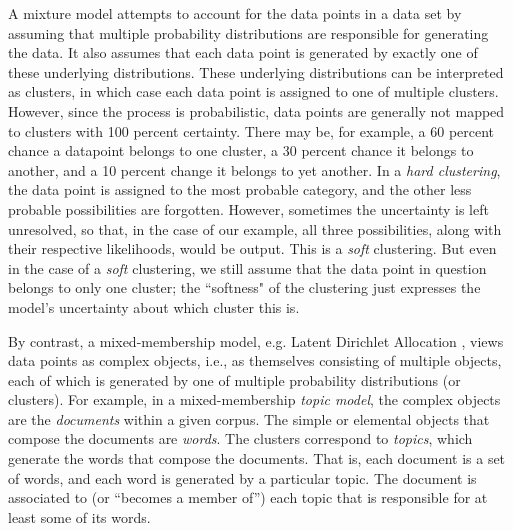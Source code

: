 A mixture model attempts to account for the data points in a data set by assuming that multiple probability
distributions are responsible for generating the data. It also assumes that each data point is generated
by exactly one of these underlying distributions. These underlying distributions can be interpreted as clusters, in which case each data point is assigned to one of multiple clusters. However, since the process is probabilistic,
data points are generally not mapped to clusters with 100 percent certainty. There may be, for example, a 60 percent chance a datapoint belongs to one cluster, a 30 percent chance it belongs to another, and a 10 percent change it belongs to yet another. In a \emph{hard clustering}, the data point is assigned to the most probable category, and the other less probable possibilities are forgotten. However, sometimes the uncertainty is left unresolved, so that, in the case of our example, all three possibilities, along with their respective likelihoods, would be output. This is a \emph{soft} clustering. But even in the case of a \emph{soft} clustering, we still assume that the data point in question belongs to only one cluster; the ``softness" of the clustering just expresses the model's uncertainty about which cluster this is. %

By contrast, a mixed-membership model, e.g. Latent Dirichlet Allocation \citep{blei-et-al:2003},
views data points as complex objects, i.e., as themselves consisting of multiple objects, 
each of which is generated by one of multiple probability distributions (or clusters). 
For example, in a mixed-membership \textit{topic model}, the complex objects are the 
\emph{documents} within a given corpus. The simple or elemental objects that compose 
the documents are \emph{words}. The clusters correspond to \emph{topics}, which generate 
the words that compose the documents. That is, each document is a set of words, and each 
word is generated by a particular topic. The document is associated to (or ``becomes a member of'') each topic that is
responsible for at least some of its words. 

